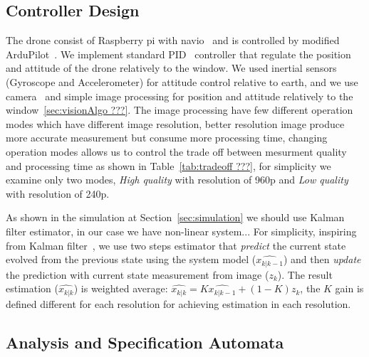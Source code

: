 \documentclass{sig-alternate-ipsn13}
\begin{document}
\subsection{Controller Design}
The drone consist of Raspberry pi with navio~\cite{??? raspberry, navio} and is controlled by modified ArduPilot~\cite{??? APM}.
We implement standard PID~\cite{??? PID} controller that regulate the position and attitude of the drone relatively to the window.
We used inertial sensors (Gyroscope and Accelerometer) for attitude control relative to earth, and we use camera~\cite{??? picam} and simple image processing for position and attitude relatively to the window~\ref{sec:visionAlgo ???}.
The image processing have few different operation modes which have different image resolution, better resolution image produce more accurate measurement but consume more processing time, changing operation modes allows us to control the trade off between mesurment quality and processing time as shown in Table~\ref{tab:tradeoff ???}, for simplicity we examine only two modes, \textit{High quality} with resolution of 960p and \textit{Low quality} with resolution of 240p.

As shown in the simulation at Section~\ref{sec:simulation} we should use Kalman filter estimator, in our case we have non-linear system... %
For simplicity, inspiring from Kalman filter~\cite{??? kalman}, we use two steps estimator that \textit{predict} the current state evolved from the previous state using the system model ($\hat{x_{k|k-1}}$) and then \textit{update} the prediction with current state measurement from image ($z_k$).
The result estimation ($\hat{x_{k|k}}$) is weighted average: 
$ \hat{x_{k|k}} = K \hat{x_{k|k-1}} + (1-K) z_k $, 
the $K$ gain is defined different for each resolution for achieving estimation in each resolution.

\subsection{Analysis and Specification Automata}
\end{document}

